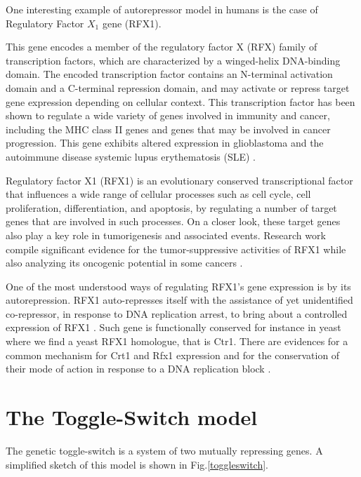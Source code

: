 \documentclass[12pt,a4paper]{report}
\begin{document}
One interesting example of autorepressor model in humans is the case of Regulatory Factor $X_{1}$ gene (RFX1).

This gene encodes a member of the regulatory factor X (RFX) family of transcription factors, which are characterized by a winged-helix DNA-binding domain. The encoded transcription factor contains an N-terminal activation domain and a C-terminal repression domain, and may activate or repress target gene expression depending on cellular context. This transcription factor has been shown to regulate a wide variety of genes involved in immunity and cancer, including the MHC class II genes and genes that may be involved in cancer progression. This gene exhibits altered expression in glioblastoma and the autoimmune disease systemic lupus erythematosis (SLE) \cite{RFX1Gene}.

Regulatory factor X1 (RFX1) is an evolutionary conserved transcriptional factor that influences a wide range of cellular processes such as cell cycle, cell proliferation, differentiation, and apoptosis, by regulating a number of target genes that are involved in such processes. On a closer look, these target genes also play a key role in tumorigenesis and associated events. Research work compile significant evidence for the tumor-suppressive activities of RFX1 while also analyzing its oncogenic potential in some cancers \cite{RFX1ArsenalAgainstCancer}.

One of the most understood ways of regulating RFX1's gene expression is by its autorepression. RFX1 auto-represses itself with the assistance of yet unidentified co-repressor, in response to DNA replication arrest, to bring about a controlled expression of RFX1 \cite{RFX1ArsenalAgainstCancer}. Such gene is functionally conserved for instance in yeast where we find a yeast RFX1 homologue, that is Ctr1. There are evidences for a common mechanism for Crt1 and Rfx1 expression and for the conservation of their mode of action in response to a DNA replication block \cite{RFX1genehumansyeast}.




\section{The Toggle-Switch model}
The genetic toggle-switch is a system of two mutually repressing genes. A simplified sketch of this model is shown in Fig.\ref{toggleswitch}.
\end{document}
